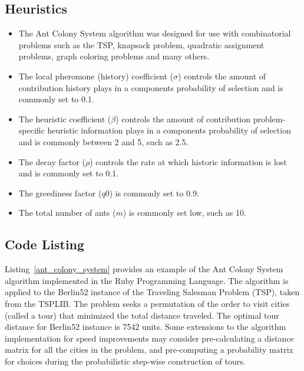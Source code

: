 \subsection{Heuristics}
\begin{itemize}
	\item The Ant Colony System algorithm was designed for use with combinatorial problems such as the TSP, knapsack problem, quadratic assignment problems, graph coloring problems and many others.
	\item The local pheromone (history) coefficient ($\sigma$) controls the amount of contribution history plays in a components probability of selection and is commonly set to 0.1.
	\item The heuristic coefficient ($\beta$) controls the amount of contribution problem-specific heuristic information plays in a components probability of selection and is commonly between 2 and 5, such as 2.5.
	\item The decay factor ($\rho$) controls the rate at which historic information is lost and is commonly set to 0.1.
	\item The greediness factor ($q0$) is commonly set to 0.9.
	\item The total number of ants ($m$) is commonly set low, such as 10.
\end{itemize}

\subsection{Code Listing}
Listing~\ref{ant_colony_system} provides an example of the Ant Colony System algorithm implemented in the Ruby Programming Language. 
The algorithm is applied to the Berlin52 instance of the Traveling Salesman Problem (TSP), taken from the TSPLIB. The problem seeks a permutation of the order to visit cities (called a tour) that minimized the total distance traveled. The optimal tour distance for Berlin52 instance is 7542 units.
Some extensions to the algorithm implementation for speed improvements may consider pre-calculating a distance matrix for all the cities in the problem, and pre-computing a probability matrix for choices during the probabilistic step-wise construction of tours. 

